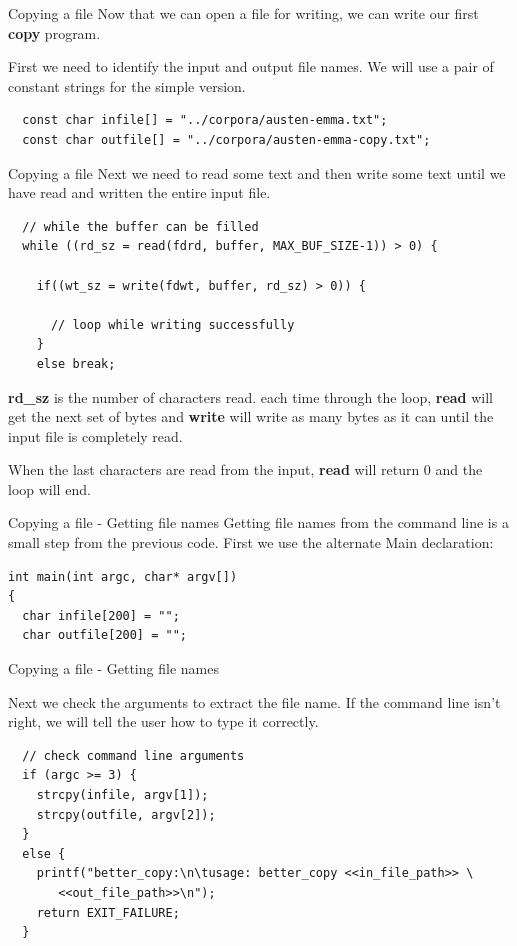 \documentclass[10pt]{beamer}
\begin{document}
\begin{frame}[fragile]{Copying a file}
Now that we can open a file for writing, we can write our first \textbf{copy} program.  

First we need to identify the input and output file names.  We will use a pair of constant strings for the simple version.

\begin{verbatim}
  const char infile[] = "../corpora/austen-emma.txt";
  const char outfile[] = "../corpora/austen-emma-copy.txt";
\end{verbatim}


\end{frame}
\begin{frame}[fragile]{Copying a file}
Next we need to read some text and then write some text until we have read and written the entire input file.

\begin{verbatim}
  // while the buffer can be filled
  while ((rd_sz = read(fdrd, buffer, MAX_BUF_SIZE-1)) > 0) {
  
    if((wt_sz = write(fdwt, buffer, rd_sz) > 0)) {

      // loop while writing successfully
    }
    else break;
\end{verbatim}

\textbf{rd\_sz} is the number of characters read.  each time through the loop, \textbf{read} will get the next set of bytes and \textbf{write} will write as many bytes as it can until the input file is completely read.  

When the last characters are read from the input, \textbf{read} will return 0 and the loop will end.

\end{frame}
\begin{frame}[fragile]{Copying a file - Getting file names}
Getting file names from the command line is a small step from the previous code.  First we use the alternate Main declaration:

\begin{verbatim}
int main(int argc, char* argv[])
{
  char infile[200] = "";
  char outfile[200] = "";
\end{verbatim}

\end{frame}
\begin{frame}[fragile]{Copying a file - Getting file names}

Next we check the arguments to extract the file name.  If the command line isn't right, we will tell the user how to type it correctly.
\fontsize{8pt}{8pt}\selectfont
\begin{verbatim}
  // check command line arguments
  if (argc >= 3) {
    strcpy(infile, argv[1]);
    strcpy(outfile, argv[2]);
  }
  else {
    printf("better_copy:\n\tusage: better_copy <<in_file_path>> \
       <<out_file_path>>\n");
    return EXIT_FAILURE;
  }
\end{verbatim}

\end{frame}
\end{document}
